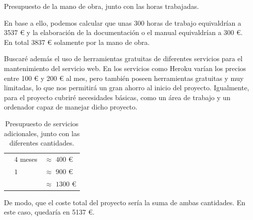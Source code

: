\begin{table}[h]
    \caption[Presupuesto de la mano de obra]{Presupuesto de la mano de obra, junto con las horas trabajadas.}\label{table:presupuesto-obra-de-mano}

\end{table}

En base a ello, podemos calcular que unas 300 horas de trabajo equivaldrían a 3537 € y la elaboración de la documentación o el manual equivaldrían a 300 €. En total 3837 € solamente por la mano de obra.

\vspace{0.3cm}

Buscaré además el uso de herramientas gratuitas de diferentes servicios para el mantenimiento del servicio web. En los servicios como Heroku varían los precios entre 100 € y 200 € al mes, pero también poseen herramientas gratuitas y muy limitadas, lo que nos permitirá un gran ahorro al inicio del proyecto. Igualmente, para el proyecto cubriré necesidades básicas, como un área de trabajo y un ordenador capaz de manejar dicho proyecto.

\vspace{0.3cm}

\begin{table}[h]

    \centering
    \setlength\arrayrulewidth{0.8pt}

    \begin{tabular}{ >{\centering\arraybackslash}m{1.2in} | >{\centering\arraybackslash}m{0.8in} | >{\centering\arraybackslash}m{0.8in} |}

    \cline{2-3}
                                                                              & \cellcolor{RoyalBlue}{Cantidad} & \cellcolor{RoyalBlue}{Coste} \\ \hline
    \multicolumn{1}{|c|}{\cellcolor{RoyalBlue}\textbf{Espacio de trabajo}} & $4$ meses                                                 & $\approx$ $400$ €                                                \\ \hline
    \multicolumn{1}{|c|}{\cellcolor{RoyalBlue}\textbf{Ordenador}}          & $1$                                                       & $\approx$ $900$ €                                                \\ \hline
    \multicolumn{1}{|c|}{\cellcolor{RoyalBlue}\textbf{Total}}              &                                                         & $\approx$ $1300$ €                                               \\ \hline
    \end{tabular}

    \caption[Presupuesto de servicios adicionales]{Presupuesto de servicios adicionales, junto con las diferentes cantidades.}\label{table:presupuesto-adicional}

\end{table}

De modo, que el coste total del proyecto sería la suma de ambas cantidades. En este caso, quedaría en 5137 €.